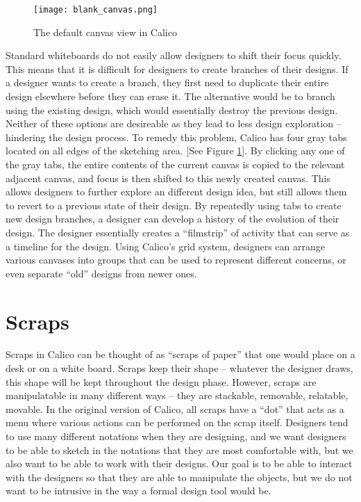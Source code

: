 \begin{figure}[h]
  \centering
  \texttt{[image: blank\_canvas.png]}
  \caption{The default canvas view in Calico}
  \label{fig:canvas}
\end{figure}
Standard whiteboards do not easily allow designers to shift their focus quickly. This means that it is difficult for designers to create branches of their designs. If a designer wants to create a branch, they first need to duplicate their entire design elsewhere before they can erase it. The alternative would be to branch using the existing design, which would essentially destroy the previous design. Neither of these options are desireable as they lead to less design exploration -- hindering the design process. To remedy this problem, Calico has four gray tabs located on all edges of the sketching area. [See Figure \ref{fig:canvas}]. By clicking any one of the gray tabs, the entire contents of the current canvas is copied to the relevant adjacent canvas, and focus is then shifted to this newly created canvas. This allows designers to further explore an different design idea, but still allows them to revert to a previous state of their design. By repeatedly using tabs to create new design branches, a designer can develop a history of the evolution of their design. The designer essentially creates a ``filmstrip'' of activity that can serve as a timeline for the design. \cite{filmstrip} Using Calico's grid system, designers can arrange various canvases into groups that can be used to represent different concerns, or even separate ``old'' designs from newer ones.



\section{Scraps}
Scraps in Calico can be thought of as ``scraps of paper'' that one would place on a desk or on a white board.
Scraps keep their shape -- whatever the designer draws, this shape will be kept throughout the design phase.
However, scraps are manipulatable in many different ways -- they are stackable, removable, relatable, movable. 
In the original version of Calico, all scraps have a ``dot'' that acts as a menu where various actions can be performed on the scrap itself.
Designers tend to use many different notations when they are designing, and we want designers to be able to sketch in the notations that they are most comfortable with, but we also want to be able to work with their designs.
Our goal is to be able to interact with the designers so that they are able to manipulate the objects, but we do not want to be intrusive in the way a formal design tool would be.

